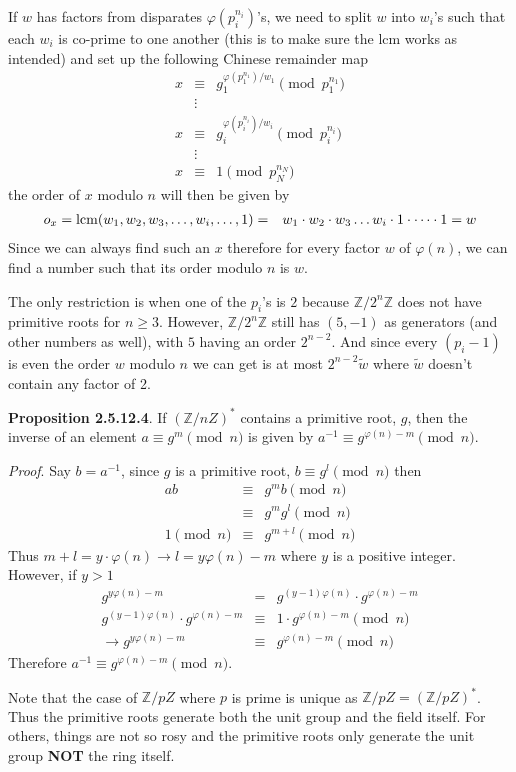 \documentclass[aps,preprint,preprintnumbers,nofootinbib,showpacs,prd]{revtex4-1}
\newcommand{\nbea}{\begin{eqnarray*}}
\newcommand{\neea}{\end{eqnarray*}}
\begin{document}
If $w$ has factors from disparates $\varphi(p_i^{n_i})$'s, we need to split $w$ into $w_i$'s such that each $w_i$ is co-prime to one another (this is to make sure the lcm works as intended) and set up the following Chinese remainder map
%
\nbea
x & \equiv & g_1^{\varphi(p_1^{n_1})/w_1} \pmod{p_1^{n_1}} \\
& \vdots & \\
x & \equiv & g_i^{\varphi(p_i^{n_i})/w_i} \pmod{p_i^{n_i}} \\
& \vdots & \\
x & \equiv & 1 \pmod{p_N^{n_N}}
\neea
%
the order of $x$ modulo $n$ will then be given by
%
\nbea
o_x = {\rm lcm}(w_1, w_2, w_3, \dots, w_i, \dots, 1) & = & w_1 \cdot w_2 \cdot w_3 \dots w_i \cdot 1 \cdot \dots \cdot 1 = w 
\neea
%
Since we can always find such an $x$ therefore for every factor $w$ of $\varphi(n)$, we can find a number such that its order modulo $n$ is $w$.

The only restriction is when one of the $p_i$'s is $2$ because $\mathbb{Z}/2^n\mathbb{Z}$ does not have primitive roots for $n \ge 3$. However, $\mathbb{Z}/2^n\mathbb{Z}$ still has $(5, -1)$ as generators (and other numbers as well), with $5$ having an order $2^{n-2}$. And since every $(p_i-1)$ is even the order $w$ modulo $n$ we can get is at most $2^{n-2} \tilde w$ where $\tilde w$ doesn't contain any factor of 2.

{\bf Proposition 2.5.12.4}. If $(\mathbb{Z}/n{Z})^*$ contains a primitive root, $g$, then the inverse of an element $a \equiv g^m \pmod{n}$ is given by $a^{-1} \equiv g^{\varphi(n) - m} \pmod{n}$.

{\it Proof}. Say $b = a^{-1}$, since $g$ is a primitive root, $b \equiv g^l \pmod{n}$ then
%
\nbea
ab & \equiv & g^m b \pmod{n}\\
& \equiv & g^m g^l \pmod{n} \\
1 \pmod{n} & \equiv & g^{m+l} \pmod{n}
\neea
%
Thus $m+l = y \cdot \varphi(n) \to l = y\varphi(n) - m$ where $y$ is a positive integer. However, if $ y > 1$
%
\nbea
g^{y\varphi(n) - m} & = & g^{(y-1)\varphi(n)} \cdot g^{\varphi(n) - m} \\
g^{(y-1)\varphi(n)} \cdot g^{\varphi(n) - m} & \equiv & 1 \cdot g^{\varphi(n) - m} \pmod{n} \\
\to g^{y\varphi(n) - m} & \equiv & g^{\varphi(n) - m} \pmod{n}
\neea
%
Therefore $a^{-1} \equiv g^{\varphi(n) - m} \pmod{n}$.

Note that the case of $\mathbb{Z}/p{Z}$ where $p$ is prime is unique as $\mathbb{Z}/p{Z} = (\mathbb{Z}/p{Z})^*$. Thus the primitive roots generate both the unit group and the field itself. For others, things are not so rosy and the primitive roots only generate the unit group {\bf NOT} the ring itself.
\end{document}
